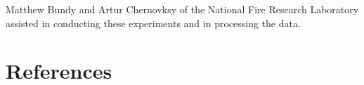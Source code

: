 \documentclass[12pt]{article}
\begin{document}
\noindent Matthew Bundy and Artur Chernovksy of the National Fire Research Laboratory assisted in conducting these experiments and in processing the data.   \\

\section*{References}



\end{document}
